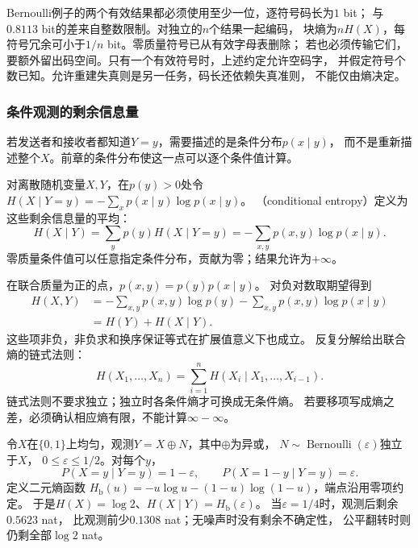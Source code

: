 Bernoulli例子的两个有效结果都必须使用至少一位，逐符号码长为\(1\) bit；
与\(0.8113\) bit的差来自整数限制。对独立的\(n\)个结果一起编码，
块熵为\(nH(X)\)，每符号冗余可小于\(1/n\) bit。零质量符号已从有效字母表删除；
若也必须传输它们，要额外留出码空间。只有一个有效符号时，上述约定允许空码字，
并假定符号个数已知。允许重建失真则是另一任务，码长还依赖失真准则，
不能仅由熵决定。

\subsubsection{条件观测的剩余信息量}
\label{sec:information-remaining-information}

若发送者和接收者都知道\(Y=y\)，需要描述的是条件分布\(p(x\mid y)\)，
而不是重新描述整个\(X\)。前章的条件分布使这一点可以逐个条件值计算。

\begin{definition}[离散条件熵]
\label{def:information-conditional-entropy}
对离散随机变量\(X,Y\)，在\(p(y)>0\)处令
\(H(X\mid Y=y)=-\sum_xp(x\mid y)\log p(x\mid y)\)。
（conditional entropy）定义为这些剩余信息量的平均：
\begin{equation}
  H(X\mid Y)=\sum_yp(y)H(X\mid Y=y)
           =-\sum_{x,y}p(x,y)\log p(x\mid y).
  \label{eq:information-conditional-entropy}
\end{equation}
零质量条件值可以任意指定条件分布，贡献为零；结果允许为\(+\infty\)。
\end{definition}

在联合质量为正的点，\(p(x,y)=p(y)p(x\mid y)\)。
对负对数取期望得到
\[
\begin{aligned}
  H(X,Y)
  &=-\sum_{x,y}p(x,y)\log p(y)
    -\sum_{x,y}p(x,y)\log p(x\mid y)\\
  &=H(Y)+H(X\mid Y).
\end{aligned}
\]
这些项非负，非负求和换序保证等式在扩展值意义下也成立。
反复分解给出联合熵的链式法则：
\begin{equation}
  H(X_1,\ldots,X_n)
  =\sum_{i=1}^nH(X_i\mid X_1,\ldots,X_{i-1}).
  \label{eq:information-entropy-chain-rule}
\end{equation}
链式法则不要求独立；独立时各条件熵才可换成无条件熵。
若要移项写成熵之差，必须确认相应熵有限，不能计算\(\infty-\infty\)。

\begin{example}[一次带噪二元观测]
\label{ex:information-binary-channel}
令\(X\)在\(\{0,1\}\)上均匀，观测\(Y=X\oplus N\)，其中\(\oplus\)为异或，
\(N\sim\operatorname{Bernoulli}(\varepsilon)\)独立于\(X\)，
\(0\leq\varepsilon\leq1/2\)。对每个\(y\)，
\[
  P(X=y\mid Y=y)=1-\varepsilon,\qquad
  P(X=1-y\mid Y=y)=\varepsilon.
\]
定义二元熵函数
\(H_{\mathrm b}(u)=-u\log u-(1-u)\log(1-u)\)，端点沿用零项约定。
于是\(H(X)=\log2\)、\(H(X\mid Y)=H_{\mathrm b}(\varepsilon)\)。
当\(\varepsilon=1/4\)时，观测后剩余\(0.5623\) nat，
比观测前少\(0.1308\) nat；无噪声时没有剩余不确定性，
公平翻转时则仍剩全部\(\log2\) nat。
\end{example}

